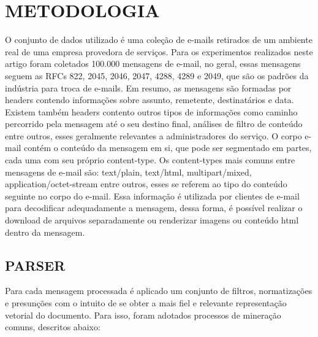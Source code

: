 \documentclass[12pt,a4paper]{article}
\begin{document}
  \section{METODOLOGIA}
  O conjunto de dados utilizado é uma coleção de e-mails retirados de um ambiente real de uma empresa provedora de serviços. 
   Para os experimentos realizados neste artigo foram coletados 100.000 mensagens de e-mail, no geral, essas mensagens seguem as RFCs 822, 2045, 2046, 2047, 4288, 4289 e 2049,
   que são os padrões da indústria para troca de e-mails.	Em resumo, as mensagens são formadas por headers contendo informações sobre assunto, remetente, destinatários e data.
   Existem também headers contento outros tipos de informações como caminho percorrido pela mensagem até o seu destino final, análises de filtro de conteúdo entre outros,
   esses geralmente relevantes a administradores do serviço. O corpo e-mail contém o conteúdo da mensagem em si, que pode ser segmentado em  partes, cada uma com seu próprio content-type. 
   Os content-types mais comuns entre mensagens de e-mail são: text/plain, text/html, multipart/mixed, application/octet-stream entre outros, esses se referem ao tipo do conteúdo seguinte no corpo do e-mail.
   Essa informação é utilizada por clientes de e-mail para decodificar adequadamente a mensagem,
   dessa forma, é possível realizar o download de arquivos separadamente ou renderizar imagens ou conteúdo html dentro da mensagem.
  
  
  \subsection{PARSER}
  Para cada mensagem processada é aplicado um conjunto de filtros, normatizações e presunções com o intuito de se obter a mais fiel e relevante representação vetorial do documento.
   Para isso, foram adotados processos de mineração comuns, descritos abaixo:
  
\end{document}
